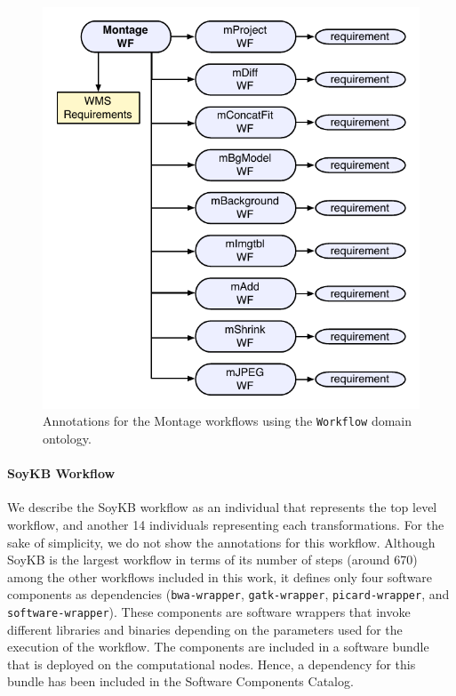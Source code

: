 \begin{figure}[!t]
	\centering
	\includegraphics[width=.85\linewidth]{figures/annotations-montage}
	\caption{Annotations for the Montage workflows using the \texttt{Workflow} domain ontology.}
	\label{fig:annotations-montage}
\end{figure}




\paragraph{\textbf{SoyKB Workflow}}
We describe the SoyKB workflow as an individual that represents the top level workflow,
and another 14 individuals representing each transformations. For the sake of simplicity,
we do not show the annotations for this workflow. Although SoyKB is the largest workflow 
in terms of its number of steps (around 670) among the other workflows included in this 
work, it defines only four software components as dependencies (\texttt{bwa-wrapper}, 
\texttt{gatk-wrapper}, \texttt{picard-wrapper}, and \texttt{software-wrapper}). These 
components  are software wrappers that invoke different libraries and binaries depending 
on the parameters used for the execution of the workflow. The components are included 
in a software bundle that is deployed on the computational nodes. Hence, a 
dependency for this bundle has been included in the Software 
Components Catalog.

